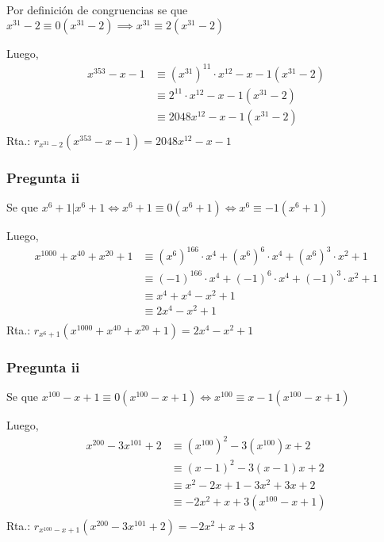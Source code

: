 Por definición de congruencias se que $ x^{31} - 2 \equiv 0(x^{31} - 2) \implies x^{31} \equiv 2(x^{31} - 2) $

Luego,
\begin{align*}
    x^{353} - x - 1 &\equiv (x^{31})^11 \cdot x^{12} - x - 1 (x^{31} - 2) \\
    &\equiv 2^11 \cdot x^{12} - x - 1 (x^{31} - 2) \\
    &\equiv 2048x^{12} - x - 1 (x^{31} - 2)\\
\end{align*}
Rta.: $ r_{x^{31} - 2}(x^{353} - x - 1) = 2048x^{12} - x - 1 $

\subsubsection{Pregunta ii}

Se que $ x^{6} + 1 | x^6 + 1 \iff x^6 + 1 \equiv 0 (x^6 + 1) \iff x^6 \equiv -1 (x^6 + 1) $

Luego,
\begin{align*}
    x^{1000} + x^{40} + x^{20} + 1 &\equiv (x^6)^{166} \cdot x^4 + (x^6)^6 \cdot x^4 + (x^6)^3 \cdot x^2 + 1 \\
    &\equiv (-1)^{166} \cdot x^4 + (-1)^6 \cdot x^4 + (-1)^3 \cdot x^2 + 1 \\
    &\equiv x^4 + x^4 - x^2 + 1 \\
    &\equiv 2x^4 - x^2 + 1 \\
\end{align*}
Rta.: $ r_{x^6 + 1}(x^{1000} + x^{40} + x^{20} + 1) = 2x^4 - x^2 + 1 $

\subsubsection{Pregunta ii}

Se que $ x^{100} - x + 1 \equiv 0 (x^{100} - x + 1) \iff x^{100} \equiv x-1(x^{100} -x + 1) $

Luego,
\begin{align*}
    x^{200} - 3x^{101} + 2 &\equiv (x^{100})^2 - 3(x^{100})x + 2 \\
    &\equiv (x-1)^2 - 3(x-1)x + 2 \\
    &\equiv x^2 - 2x + 1 - 3x^2 + 3x + 2 \\
    &\equiv -2x^2 + x + 3 (x^{100} -x + 1) \\
\end{align*}
Rta.: $ r_{x^{100} -x + 1}(x^{200} - 3x^{101} + 2) = -2x^2 + x + 3 $

